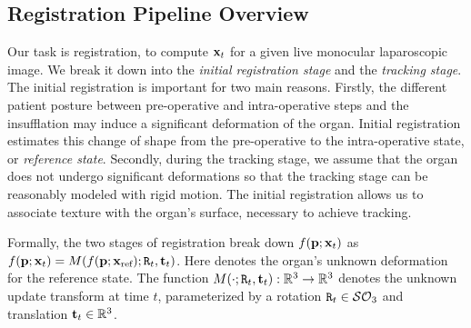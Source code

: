 \subsection{Registration Pipeline Overview}
\label{sec:globalOverview}
Our task is registration, to compute $\mathbf{x}_t$ for a given live monocular laparoscopic image. 
We break it down into the \textit{initial registration stage} and the \emph{tracking stage}. 
The initial registration is important for two main reasons. Firstly, the different patient posture between pre-operative and intra-operative steps and the insufflation may induce a significant deformation of the organ. Initial registration estimates this change of shape from the pre-operative to the intra-operative state, or \emph{reference state}. 
Secondly, during the tracking stage, we assume that the organ does not undergo significant deformations so that the tracking stage can be reasonably modeled with rigid motion.  The initial registration allows us to associate texture with the organ's surface, necessary to achieve tracking.

Formally, the two stages of registration break down $f(\mathbf{p};\mathbf{x}_t)$ as $f(\vet{p};\vet{x}_{t})=M(f(\vet{p};\xref);\mat{R}_{t},\vet{t}_{t})$. Here \xref denotes the organ's unknown deformation for the reference state.
The function $M(\cdot;\mat{R}_{t},\vet{t}_{t}):\mathbb{R}^3\rightarrow \mathbb{R}^3$ denotes the unknown update transform at time $t$, parameterized by a rotation $\mat{R}_{t}\in \mathcal{SO}_{3}$ and translation $\mathbf{t}_{t}\in \mathbb{R}^3$.

